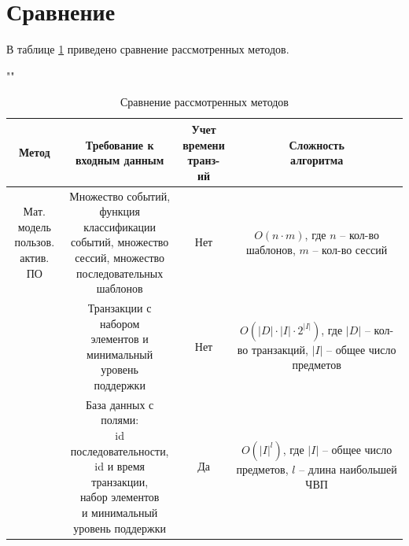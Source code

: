 \section{Сравнение}

В таблице \ref{tab} приведено сравнение рассмотренных методов.

\begin{table}[H]
	\begin{center}
		\caption{Сравнение рассмотренных методов}
		\label{tab}
		""\newline
		\begin{tabular}{ | c | c | c | c | }
			\hline
			Метод & \specialcell{Требование к\\ входным данным}  & \specialcell{Учет\\времени \\транз-ий} & \specialcell{Сложность\\алгоритма} \\ \hline
			
			\specialcell{Мат. модель\\пользов.\\актив. ПО} & \specialcell{Множество событий,\\функция классификации\\событий, множество\\сессий, множество\\последовательных\\шаблонов} & Нет & \specialcell{$O(n \cdot m)$, где $n$ --\\кол-во шаблонов,\\$m$ -- кол-во сессий} \\ \hline
			
			\specialcell{Apriori} & \specialcell{Транзакции с набором\\элементов и\\минимальный уровень\\поддержки} & Нет & \specialcell{$O(|D| \cdot |I| \cdot 2^{|I|})$,\\где $|D|$ -- кол-во\\транзакций,\\$|I|$ -- общее число\\предметов} \\ \hline
			
			\specialcell{GSP} & \specialcell{База данных с полями:\\id последовательности,\\id и время транзакции,\\набор элементов\\и минимальный\\уровень поддержки} & Да & \specialcell{$O(|I|^l)$, где $|I|$ --\\общее число\\предметов,\\$l$ -- длина\\наибольшей ЧВП} \\ \hline
			

\end{tabular}
\end{center}
\end{table}

